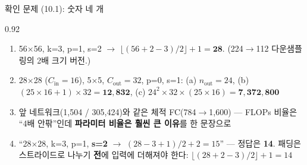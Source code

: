 \begin{frame}{확인 문제 (10.1): 숫자 네 개}
\begin{center}\begin{varwidth}{0.92\textwidth}
  \small
  \begin{enumerate}
    \item {} 56$\times$56, k=3, p=1, s=2 $\to$
      $\lfloor(56+2-3)/2\rfloor+1 = \mathbf{28}$.
      (224$\to$112 다운샘플링의 2배 크기 버전.)
    \item {} 28$\times$28 ($C_{\text{in}}{=}16$),
      5$\times$5, $C_{\text{out}}{=}32$, p=0, s=1:
      (a) $n_{\text{out}}=24$,
      (b) $(25\times16+1)\times32 = \mathbf{12{,}832}$,
      (c) $24^2\times32\times(25\times16) = \mathbf{7{,}372{,}800}$
    \item {} 앞 네트워크(1,504 / 305,424)와
      같은 체적 FC(784$\to$1,600) --- FLOPs 비율은 ``4배 안팎''인데
      \textbf{파라미터 비율은 훨씬 큰 이유}를 한 문장으로
    \item {} ``28$\times$28, k=3, p=1, \textbf{s=2} $\to$
      $(28-3+1)/2 + 2 = 15$'' --- 정답은 \textbf{14}.
      패딩은 스트라이드로 나누기 \textbf{전}에 입력에 더해져야 한다:
      $\lfloor(28+2-3)/2\rfloor+1 = 14$
  \end{enumerate}
\end{varwidth}\end{center}
\end{frame}
